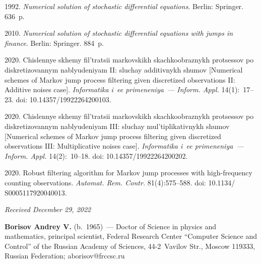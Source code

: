 \begin{multicols}{2}
{{\begin{thebibliography}{99}
 1992. \textit{Numerical solution of stochastic differential equations}. Berlin: Springer. 636~p.

 2010. \textit{Numerical solution of stochastic differential equations with jumps in finance}.
 Berlin: Springer. 884~p.

 2020. Chis\-len\-nye skhe\-my fil't\-ra\-tsii mar\-kov\-skikh skach\-ko\-ob\-raz\-nykh pro\-tses\-sov po 
dis\-kre\-ti\-zo\-van\-nym nab\-lyu\-de\-niyam II: slu\-chay ad\-di\-tiv\-nykh shu\-mov
 [Numerical schemes of Markov jump process filtering given discretized observations II: Additive noises case]. 
 \textit{Informatika i~ee primeneniya~---  Inform. Appl.} 14(1):~17--23. doi: 10.14357/19922264200103.


 2020. Chis\-len\-nye skhe\-my fil't\-ra\-tsii mar\-kov\-skikh skach\-ko\-ob\-raz\-nykh pro\-tses\-sov 
po dis\-kre\-ti\-zo\-van\-nym nablyu\-de\-ni\-yam III: 
slu\-chay mul'\-ti\-pli\-ka\-tiv\-nykh shu\-mov [Numerical schemes of Markov jump process filtering given discretized 
observations III: Multiplicative noises case]. 
\textit{Informatika i~ee primeneniya~--- Inform. Appl.} 14(2):~10--18. doi: 10.14357/19922264200202.

 2020. Robust filtering algorithm for Markov jump processes with high-frequency counting observations. \textit{Automat. Rem. Contr.} 81(4):575--588. 
doi: 10.1134/ S0005117920040013.
\end{thebibliography}

 }
 }

\end{multicols}

\vspace*{-6pt}

\hfill{\small\textit{Received December 29, 2022}} 

\vspace*{-20pt}

\Contrl

\vspace*{-4pt}

\noindent
\textbf{Borisov Andrey V.} (b.\ 1965)~--- 
Doctor of Science in physics and mathematics, principal scientist, Federal Research Center ``Computer Science and Control''
 of the Russian Academy of Sciences, 44-2~Vavilov Str., Moscow 119333, Russian Federation; \mbox{aborisov@frccsc.ru}




\label{end\stat}

\renewcommand{\bibname}{\protect\rm Литература} 